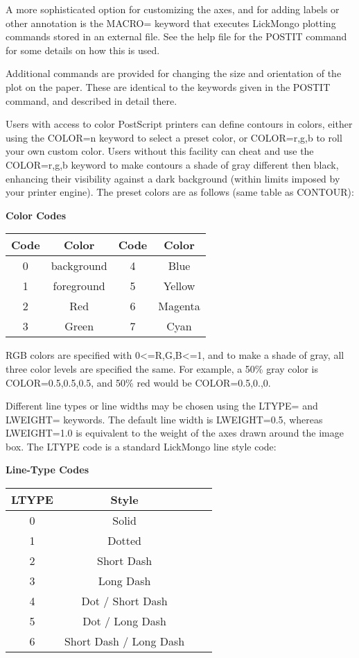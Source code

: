 A more sophisticated option for customizing the axes, and for adding labels
or other annotation is the MACRO= keyword that executes LickMongo plotting
commands stored in an external file.  See the help file for the POSTIT
command for some details on how this is used.


Additional commands are provided for changing the size and orientation of
the plot on the paper.  These are identical to the keywords given in the
POSTIT command, and described in detail there.


Users with access to color PostScript printers can define contours in
colors, either using the COLOR=n keyword to select a preset color, or
COLOR=r,g,b to roll your own custom color.  Users without this facility can
cheat and use the COLOR=r,g,b keyword to make contours a shade of gray
different then black, enhancing their visibility against a dark background
(within limits imposed by your printer engine).  The preset colors are as
follows (same table as CONTOUR):

\begin{center}
{\bf Color Codes}\\
\begin{tabular}{cccc}
\hline
Code & Color & Code & Color\\
\hline
0 & background & 4 & Blue\\    
1 & foreground & 5 & Yellow\\  
2 & Red        & 6 & Magenta\\ 
3 & Green      & 7 & Cyan\\    
\hline
\end{tabular}
\end{center}

RGB colors are specified with 0<=R,G,B<=1, and to make a shade of gray, all
three color levels are specified the same.  For example, a 50\% gray color
is COLOR=0.5,0.5,0.5, and 50\% red would be COLOR=0.5,0.,0.

Different line types or line widths may be chosen using the LTYPE= and
LWEIGHT= keywords.  The default line width is LWEIGHT=0.5, whereas
LWEIGHT=1.0 is equivalent to the weight of the axes drawn around the
image box.  The LTYPE code is a standard LickMongo line style code:

\begin{center}
{\bf Line-Type Codes}\\
\begin{tabular}{cccc}
\hline
LTYPE & Style \\
\hline
0 & Solid    \\   
1 & Dotted     \\       
2 & Short Dash   \\     
3 & Long Dash\\
4 & Dot / Short Dash\\
5 & Dot / Long Dash\\
6 & Short Dash / Long Dash\\
\hline
\end{tabular}
\end{center}

